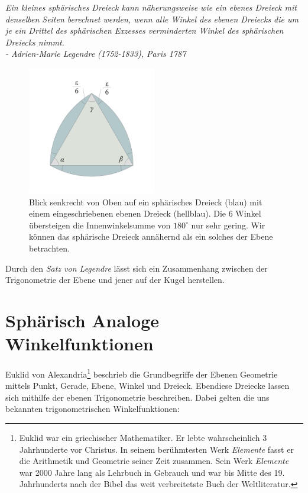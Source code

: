 \begin{refsection}
\begin{satz}\textit{Ein kleines sphärisches Dreieck kann näherungsweise 
wie ein ebenes Dreieck mit denselben Seiten berechnet 
werden, wenn alle Winkel des ebenen Dreiecks die um 
je ein Drittel des sphärischen Exzesses verminderten 
Winkel des sphärischen Dreiecks nimmt. \\
\quad \quad - Adrien-Marie Legendre (1752-1833), Paris 1787}
\label{skript:kugel:satz:Legendre}
\end{satz}

\begin{figure}[htbp]
\centering
\includegraphics[width=0.5\textwidth]{kugel/SphaerischerExzess.jpg}
\caption{Blick senkrecht von Oben auf ein sphärisches Dreieck (blau) mit einem eingeschriebenen ebenen Dreieck (hellblau). Die 6 Winkel übersteigen die Innenwinkelsumme von $180^{\circ}$ nur sehr gering. Wir können das sphärische Dreieck annähernd als ein solches der Ebene betrachten.}
\end{figure}

Durch den \textit{Satz von Legendre} lässt sich ein Zusammenhang zwischen der Trigonometrie der Ebene und jener auf der Kugel herstellen.


\section{Sphärisch Analoge Winkelfunktionen}
Euklid von Alexandria\footnote{%
Euklid war ein griechischer Mathematiker. Er lebte wahrscheinlich 3 Jahrhunderte vor Christus. In seinem berühmtesten Werk \textit{Elemente} fasst er die Arithmetik und Geometrie seiner Zeit zusammen. Sein Werk \textit{Elemente} war 2000 Jahre lang als Lehrbuch in Gebrauch und war bis Mitte des 19. Jahrhunderts nach der Bibel das weit verbreitetste Buch der Weltliteratur.}  beschrieb die Grundbegriffe der Ebenen Geometrie mittels Punkt, Gerade, Ebene, Winkel und Dreieck. Ebendiese Dreiecke lassen sich mithilfe der ebenen Trigonometrie beschreiben. Dabei gelten die uns bekannten trigonometrischen Winkelfunktionen:


\end{refsection}
